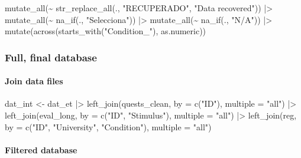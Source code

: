 \documentclass[
  bookmarksnumbered]{article}
\newenvironment{Shaded}{\begin{snugshade}}{\end{snugshade}}
\newcommand{\AttributeTok}[1]{\textcolor[rgb]{0.80,0.80,0.80}{#1}}
\newcommand{\FunctionTok}[1]{\textcolor[rgb]{0.94,0.94,0.56}{#1}}
\newcommand{\NormalTok}[1]{\textcolor[rgb]{0.80,0.80,0.80}{#1}}
\newcommand{\OtherTok}[1]{\textcolor[rgb]{0.94,0.94,0.56}{#1}}
\newcommand{\SpecialCharTok}[1]{\textcolor[rgb]{0.86,0.64,0.64}{#1}}
\newcommand{\StringTok}[1]{\textcolor[rgb]{0.80,0.58,0.58}{#1}}
\begin{document}
\begin{Shaded}
\begin{Highlighting}[]
  \FunctionTok{mutate\_all}\NormalTok{(}\SpecialCharTok{\textasciitilde{}} \FunctionTok{str\_replace\_all}\NormalTok{(., }\StringTok{"RECUPERADO"}\NormalTok{, }\StringTok{"Data recovered"}\NormalTok{)) }\SpecialCharTok{|\textgreater{}}
  \FunctionTok{mutate\_all}\NormalTok{(}\SpecialCharTok{\textasciitilde{}} \FunctionTok{na\_if}\NormalTok{(., }\StringTok{"Selecciona"}\NormalTok{)) }\SpecialCharTok{|\textgreater{}}
  \FunctionTok{mutate\_all}\NormalTok{(}\SpecialCharTok{\textasciitilde{}} \FunctionTok{na\_if}\NormalTok{(., }\StringTok{"N/A"}\NormalTok{)) }\SpecialCharTok{|\textgreater{}}
  \FunctionTok{mutate}\NormalTok{(}\FunctionTok{across}\NormalTok{(}\FunctionTok{starts\_with}\NormalTok{(}\StringTok{"Condition\_"}\NormalTok{), as.numeric))}
\end{Highlighting}
\end{Shaded}

\subsubsection{Full, final database}\label{full-final-database}

\paragraph{Join data files}\label{join-data-files}

\begin{Shaded}
\begin{Highlighting}[]
\NormalTok{dat\_int }\OtherTok{\textless{}{-}}\NormalTok{ dat\_et }\SpecialCharTok{|\textgreater{}} 
  \FunctionTok{left\_join}\NormalTok{(quests\_clean, }\AttributeTok{by =} \FunctionTok{c}\NormalTok{(}\StringTok{"ID"}\NormalTok{), }\AttributeTok{multiple =} \StringTok{"all"}\NormalTok{) }\SpecialCharTok{|\textgreater{}}
  \FunctionTok{left\_join}\NormalTok{(eval\_long, }\AttributeTok{by =} \FunctionTok{c}\NormalTok{(}\StringTok{"ID"}\NormalTok{, }\StringTok{"Stimulus"}\NormalTok{), }\AttributeTok{multiple =} \StringTok{"all"}\NormalTok{) }\SpecialCharTok{|\textgreater{}} 
  \FunctionTok{left\_join}\NormalTok{(reg, }\AttributeTok{by =} \FunctionTok{c}\NormalTok{(}\StringTok{"ID"}\NormalTok{, }\StringTok{"University"}\NormalTok{, }\StringTok{"Condition"}\NormalTok{), }\AttributeTok{multiple =} \StringTok{"all"}\NormalTok{) }
\end{Highlighting}
\end{Shaded}

\paragraph{Filtered database}\label{filtered-database}
\end{document}
